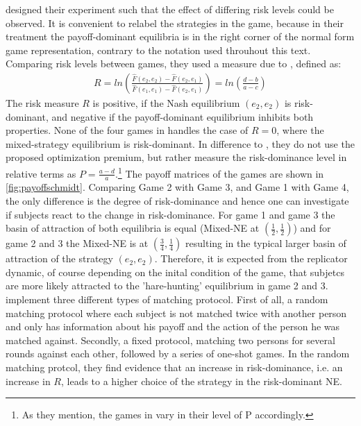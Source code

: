 \documentclass[11pt]{article}
\begin{document}
\textcite{schmidt_playing_2003} designed their experiment such that the effect
of differing risk levels could be observed. It is convenient to relabel 
the strategies in the game, because in their treatment the payoff-dominant 
equilibria is in the right corner of the normal form game representation,
contrary to the notation used throuhout this text. Comparing risk levels between
games, they used a measure due to \cite{Seltenanaxiomaticriskmeasure}, defined
as:
\begin{align}
        \label{riskmeasureschmidt}
        R = ln\left(\frac{\hat{F}(e_2,e_2) -\hat{F}(e_2,e_1)}{\hat{F}(e_1,e_1) 
        -\hat{F}(e_2,e_1)}\right) = ln \left(\frac{d-b}{a-c}\right)
\end{align}
The risk measure $R$ is positive, if the Nash equilibrium $(e_2,e_2)$ is
risk-dominant, and negative if the payoff-dominant equilibrium inhibits both
properties.
None of the four games in \textcite{schmidt_playing_2003} handles
the case of $R=0$, where the mixed-strategy equilibrium is risk-dominant.
In difference to \textcite{battalio_optimization_2001}, they do not
use the proposed optimization premium, but rather measure the risk-dominance 
level in relative terms as $P=\frac{a-d}{a}$.\footnote{As they mention, the 
games in \textcite{battalio_optimization_2001} vary in their level of 
P accordingly.}
The payoff matrices of the games are shown in \ref{fig:payoffschmidt}.
Comparing Game 2 with Game 3, and Game 1 with Game 4, the only difference is the 
degree of risk-dominance and hence one can investigate if subjects react 
to the change in risk-dominance. For game 1 and game 3 the basin of attraction
of both equilibria is equal (Mixed-NE at $(\frac 12, \frac 12)$) and  for
game 2 and 3 the Mixed-NE is at $(\frac 34,\frac 14)$ resulting in the typical 
larger basin of attraction of the strategy $(e_2,e_2)$. Therefore, it is  
expected from the replicator dynamic, of course depending on the inital condition 
of the game, that subjetcs are more likely attracted to the 'hare-hunting' 
equilibrium in game 2 and 3.
\textcite{schmidt_playing_2003} implement three different types of matching
protocol. First of all, a random matching protocol where each subject is not
matched twice with another person and only has information about his payoff and
the action of the person he was matched against. 
Secondly, a fixed protocol, matching two persons for several rounds against 
each other, followed by a series of one-shot games. 
In the random matching protcol, they find evidence that an increase in 
risk-dominance, i.e. an increase in $R$, leads to a higher choice of the
strategy in the risk-dominant NE. 
\end{document}
